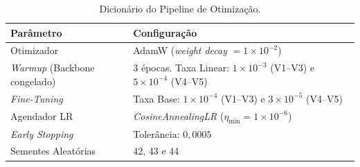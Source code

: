 \documentclass[oneside,english,brazilian]{UNISINOSmonografia}
\begin{document}
\begin{table}[H]
    \centering
    \caption{Dicionário do Pipeline de Otimização.}
    \label{tab:apendice_hiperparametros}
    \begin{tabular}{ll}
        \toprule
        \textbf{Parâmetro} & \textbf{Configuração} \\
        \midrule
        Otimizador & AdamW (\textit{weight decay} $= 1 \times 10^{-2}$) \\
        \textit{Warmup} (Backbone congelado) & 3 épocas. Taxa Linear: $1 \times 10^{-3}$ (V1--V3) e $5 \times 10^{-4}$ (V4--V5) \\
        \textit{Fine-Tuning} & Taxa Base: $1 \times 10^{-4}$ (V1--V3) e $3 \times 10^{-5}$ (V4--V5) \\
        Agendador LR & \textit{CosineAnnealingLR} ($\eta_{\min} = 1 \times 10^{-6}$) \\
        \textit{Early Stopping} & Tolerância: $0{,}0005$ \\
        Sementes Aleatórias & 42, 43 e 44 \\
        \bottomrule
    \end{tabular}
\end{table}



\end{document}
